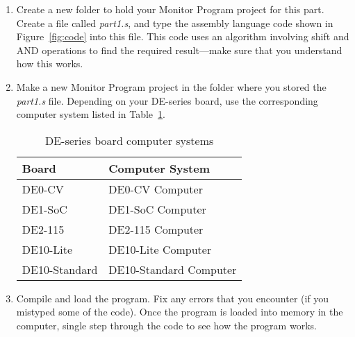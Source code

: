 \documentclass[epsfig,10pt,fullpage]{article}
\begin{document}
\begin{enumerate}
\item Create a new folder to hold your Monitor Program project for this part. Create a
file called {\it part1.s}, and type the assembly language code shown in 
Figure~\ref{fig:code} into this file.
This code uses an algorithm involving shift and AND operations to find the required 
result---make sure that you understand how this works.

\item
Make a new Monitor Program project in the folder where you stored the {\it part1.s}
file. Depending on your DE-series board, use the corresponding computer system 
listed in Table~\ref{tab:computer_systems}.

\begin{table}[H]
	\begin{center}
	\begin{tabular}{ l | l }
	\bf{Board} & \bf{Computer System} \\
	\hline
	\rule{0pt}{3ex}DE0-CV & DE0-CV Computer \\ 
	DE1-SoC & DE1-SoC Computer \\
	DE2-115 & DE2-115 Computer \\
	DE10-Lite & DE10-Lite Computer \\
	DE10-Standard & DE10-Standard Computer \\
	\end{tabular}
	\caption{DE-series board computer systems}
	\label{tab:computer_systems}
	\end{center}
\end{table}

\item
Compile and load the program. Fix any errors that you encounter (if you mistyped some of
the code). Once the program is loaded into memory in the computer, single step
through the code to see how the program works.
\end{enumerate}

\newpage
\end{document}
